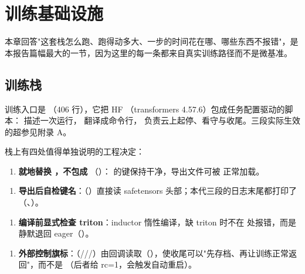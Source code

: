 \documentclass[11pt,openany]{ctexart}
\begin{document}
\section{训练基础设施}

本章回答"这套栈怎么跑、跑得动多大、一步的时间花在哪、哪些东西不报错"，是本报告篇幅最大的一节，因为这里的每一条都来自真实训练路径而不是微基准。

\subsection{训练栈}

训练入口是 （406 行），它把 HF （transformers 4.57.6）包成任务配置驱动的脚本： 描述一次运行， 翻译成命令行， 负责云上起停、看守与收尾。三段实际生效的超参见附录 A。

栈上有四处值得单独说明的工程决定：

\begin{enumerate}
  \item \textbf{ 就地替换 ，不包成 }（）： 的键保持干净，导出文件可被  正常加载。
\end{enumerate}
\begin{enumerate}
  \item \textbf{导出后自检键名}：（）直接读 safetensors 头部；本代三段的日志末尾都打印了 （、）。
\end{enumerate}
\begin{enumerate}
  \item \textbf{编译前显式检查 triton}：inductor 惰性编译，缺 triton 时不在  处报错，而是静默退回 eager（）。
\end{enumerate}
\begin{enumerate}
  \item \textbf{外部控制旗标}：（///）由回调读取（），使收尾可以"先存档、再让训练正常返回"，而不是 （后者给 rc=1，会触发自动重启）。
\end{enumerate}
\end{document}
